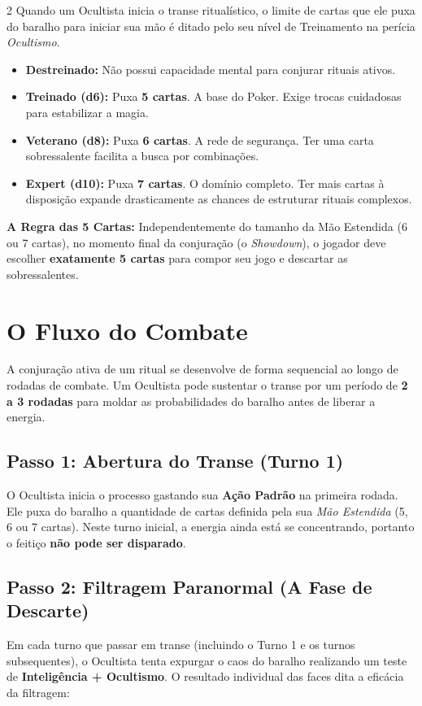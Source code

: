 \documentclass[a4paper,11pt,openany]{book}
\begin{document}
\begin{multicols}{2}
Quando um Ocultista inicia o transe ritualístico, o limite de cartas que ele puxa do baralho para iniciar sua mão é ditado pelo seu nível de Treinamento na perícia \textit{Ocultismo}.

\begin{itemize}
    \item \textbf{Destreinado:} Não possui capacidade mental para conjurar rituais ativos.
    \item \textbf{Treinado (d6):} Puxa \textbf{5 cartas}. A base do Poker. Exige trocas cuidadosas para estabilizar a magia.
    \item \textbf{Veterano (d8):} Puxa \textbf{6 cartas}. A rede de segurança. Ter uma carta sobressalente facilita a busca por combinações.
    \item \textbf{Expert (d10):} Puxa \textbf{7 cartas}. O domínio completo. Ter mais cartas à disposição expande drasticamente as chances de estruturar rituais complexos.
\end{itemize}

\begin{regra}
\textbf{A Regra das 5 Cartas:} Independentemente do tamanho da Mão Estendida (6 ou 7 cartas), no momento final da conjuração (o \textit{Showdown}), o jogador deve escolher \textbf{exatamente 5 cartas} para compor seu jogo e descartar as sobressalentes.
\end{regra}

\section{O Fluxo do Combate}

A conjuração ativa de um ritual se desenvolve de forma sequencial ao longo de rodadas de combate. Um Ocultista pode sustentar o transe por um período de \textbf{2 a 3 rodadas} para moldar as probabilidades do baralho antes de liberar a energia.

\subsection{Passo 1: Abertura do Transe (Turno 1)}
O Ocultista inicia o processo gastando sua \textbf{Ação Padrão} na primeira rodada. Ele puxa do baralho a quantidade de cartas definida pela sua \textit{Mão Estendida} (5, 6 ou 7 cartas). Neste turno inicial, a energia ainda está se concentrando, portanto o feitiço \textbf{não pode ser disparado}.

\subsection{Passo 2: Filtragem Paranormal (A Fase de Descarte)}
Em cada turno que passar em transe (incluindo o Turno 1 e os turnos subsequentes), o Ocultista tenta expurgar o caos do baralho realizando um teste de \textbf{Inteligência + Ocultismo}. O resultado individual das faces dita a eficácia da filtragem:


\end{multicols}
\end{document}
